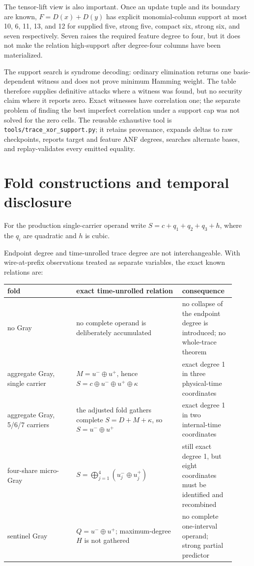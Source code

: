 \documentclass[11pt]{article}
\newcommand{\xor}{\oplus}
\newcommand{\code}[1]{\texttt{#1}}
\begin{document}
The tensor-lift view is also important.  Once an update tuple and its boundary
are known, $F=D(x)+D(y)$ has explicit monomial-column support at most 10, 6,
11, 13, and 12 for supplied five, strong five, compact six, strong six, and
seven respectively.  Seven raises the required feature degree to four, but it
does not make the relation high-support after degree-four columns have been
materialized.

The support search is syndrome decoding: ordinary elimination returns one
basis-dependent witness and does not prove minimum Hamming weight.  The table
therefore supplies definitive attacks where a witness was found, but no
security claim where it reports zero.  Exact witnesses have correlation one;
the separate problem of finding the best imperfect correlation under a
support cap was not solved for the zero cells.  The reusable exhaustive tool is
\code{tools/trace\_xor\_support.py}; it retains provenance, expands deltas to
raw checkpoints, reports target and feature ANF degrees, searches alternate
bases, and replay-validates every emitted equality.

\section{Fold constructions and temporal disclosure}

For the production single-carrier operand write
$S=c+q_1+q_2+q_3+h$, where the $q_i$ are quadratic and $h$ is cubic.

Endpoint degree and time-unrolled trace degree are not interchangeable.  With
wire-at-prefix observations treated as separate variables, the exact known
relations are:

\begin{center}
\begin{tabular}{@{}p{0.28\linewidth}p{0.43\linewidth}p{0.21\linewidth}@{}}
\toprule
fold & exact time-unrolled relation & consequence \\
\midrule
no Gray & no complete operand is deliberately accumulated & no collapse of the endpoint degree is introduced; no whole-trace theorem \\
aggregate Gray, single carrier & $M=u^-\xor u^+$, hence $S=c\xor u^-\xor u^+\xor\kappa$ & exact degree 1 in three physical-time coordinates \\
aggregate Gray, 5/6/7 carriers & the adjusted fold gathers complete $S=D+M+\kappa$, so $S=u^-\xor u^+$ & exact degree 1 in two internal-time coordinates \\
four-share micro-Gray & $S=\bigoplus_{j=1}^{4}(u_j^-\xor u_j^+)$ & still exact degree 1, but eight coordinates must be identified and recombined \\
sentinel Gray & $Q=u^-\xor u^+$; maximum-degree $H$ is not gathered & no complete one-interval operand; strong partial predictor \\
\bottomrule
\end{tabular}
\end{center}
\end{document}
